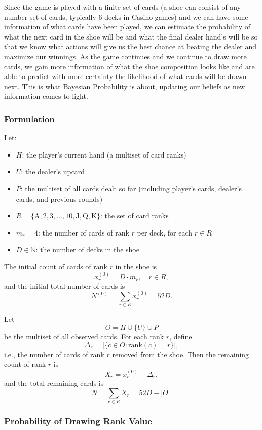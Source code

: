 \documentclass[12pt,a4paper]{cibb}
\begin{document}
Since the game is played with a finite set of cards (a shoe can consist of any number set of cards, typically 6 decks in Casino games) and we can have some information of what cards have been played, we can estimate the probability of what the next card in the shoe will be and what the final dealer hand's will be so that we know what actions will give us the best chance at beating the dealer and maximize our winnings. As the game continues and we continue to draw more cards, we gain more information of what the shoe composition looks like and are able to predict with more certainty the likelihood of what cards will be drawn next. This is what Bayesian Probability is about, updating our beliefs as new information comes to light.

\subsubsection{Formulation}

Let:
\begin{itemize}
  \item \(H\): the player's current hand (a multiset of card ranks)
  \item \(U\): the dealer's upcard
  \item \(P\): the multiset of all cards dealt so far (including player's cards, dealer's cards, and previous rounds)
  \item \(R = \{\mathrm{A}, 2, 3, \dots, 10, \mathrm{J}, \mathrm{Q}, \mathrm{K}\}\): the set of card ranks
  \item \(m_r = 4\): the number of cards of rank \(r\) per deck, for each \(r \in R\)
  \item \(D \in \mathbb{N}\): the number of decks in the shoe
\end{itemize}

The initial count of cards of rank \(r\) in the shoe is
\[
  x_r^{(0)} = D \cdot m_r, \quad r\in R,
\]
and the initial total number of cards is
\[
  N^{(0)} = \sum_{r\in R} x_r^{(0)} = 52D.
\]

Let
\[
  O = H \cup \{U\} \cup P
\]
be the multiset of all observed cards. For each rank \(r\), define
\[
  \Delta_r = |\{c \in O : \mathrm{rank}(c)=r\}|,
\]
i.e., the number of cards of rank \(r\) removed from the shoe. Then the remaining count of rank \(r\) is
\[
  X_r = x_r^{(0)} - \Delta_r,
\]
and the total remaining cards is
\[
  N = \sum_{r\in R} X_r = 52D - |O|.
\]

\subsubsection{Probability of Drawing Rank Value}
\end{document}
